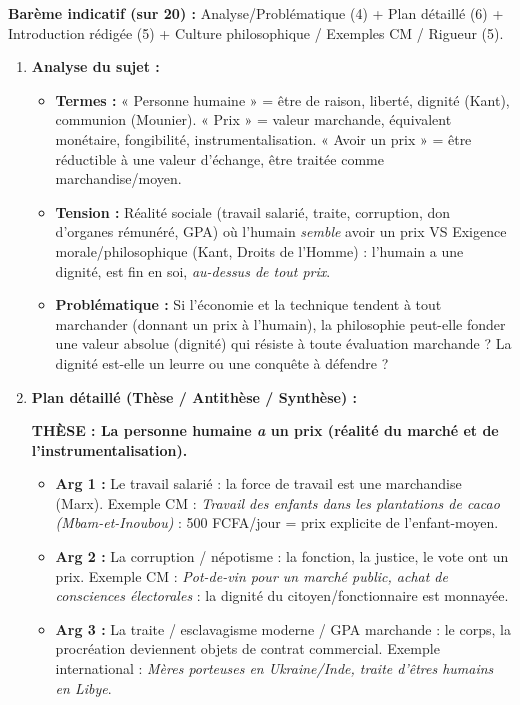 \documentclass[11pt]{article}
\newcommand{\cle}[1]{{\popxbold\color{popdark}#1}}
\begin{document}
\begin{corrige}
\textbf{Barème indicatif (sur 20) :} Analyse/Problématique (4) + Plan détaillé (6) + Introduction rédigée (5) + Culture philosophique / Exemples CM / Rigueur (5).

\begin{enumerate}
    \item \textbf{Analyse du sujet :}
    \begin{itemize}
        \item \textbf{Termes :} « Personne humaine » = être de raison, liberté, dignité (Kant), communion (Mounier). « Prix » = valeur marchande, équivalent monétaire, fongibilité, instrumentalisation. « Avoir un prix » = être réductible à une valeur d'échange, être traitée comme marchandise/moyen.
        \item \textbf{Tension :} Réalité sociale (travail salarié, traite, corruption, don d'organes rémunéré, GPA) où l'humain \emph{semble} avoir un prix VS Exigence morale/philosophique (Kant, Droits de l'Homme) : l'humain a une \cle{dignité}, est \cle{fin en soi}, \emph{au-dessus de tout prix}.
        \item \textbf{Problématique :} Si l'économie et la technique tendent à tout marchander (donnant un prix à l'humain), la philosophie peut-elle fonder une valeur absolue (dignité) qui résiste à toute évaluation marchande ? La dignité est-elle un leurre ou une conquête à défendre ?
    \end{itemize}

    \item \textbf{Plan détaillé (Thèse / Antithèse / Synthèse) :}

    \textbf{THÈSE : La personne humaine \emph{a} un prix (réalité du marché et de l'instrumentalisation).}
    \begin{itemize}
        \item \textbf{Arg 1 :} Le travail salarié : la force de travail est une marchandise (Marx). Exemple CM : \emph{Travail des enfants dans les plantations de cacao (Mbam-et-Inoubou)} : 500 FCFA/jour = prix explicite de l'enfant-moyen.
        \item \textbf{Arg 2 :} La corruption / népotisme : la fonction, la justice, le vote ont un prix. Exemple CM : \emph{Pot-de-vin pour un marché public, achat de consciences électorales} : la dignité du citoyen/fonctionnaire est monnayée.
        \item \textbf{Arg 3 :} La traite / esclavagisme moderne / GPA marchande : le corps, la procréation deviennent objets de contrat commercial. Exemple international : \emph{Mères porteuses en Ukraine/Inde, traite d'êtres humains en Libye}.
    \end{itemize}


\end{enumerate}
\end{corrige}
\end{document}
